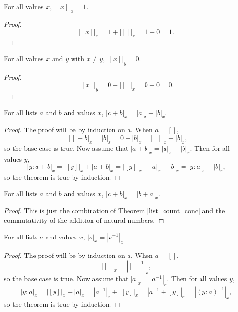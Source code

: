 \documentclass[../math.tex]{subfiles}
\begin{document}
\begin{theorem}
    For all values $x$, $|[x]|_x = 1$.
\end{theorem}
\begin{proof}
    \[
        |[x]|_x = 1 + |[]|_x = 1 + 0 = 1.
    \]
\end{proof}

\begin{theorem}
    For all values $x$ and $y$ with $x \neq y$, $|[x]|_y = 0$.
\end{theorem}
\begin{proof}
    \[
        |[x]|_y = 0 + |[]|_x = 0 + 0 = 0.
    \]
\end{proof}

\begin{theorem} \label{list_count_conc}
    For all lists $a$ and $b$ and values $x$, $|a + b|_x = |a|_x + |b|_x$.
\end{theorem}
\begin{proof}
    The proof will be by induction on $a$.  When $a = []$,
    \[
        |[] + b|_x = |b|_x = 0 + |b|_x = |[]|_x + |b|_x,
    \]
    so the base case is true.  Now assume that $|a + b|_x = |a|_x + |b|_x$.
    Then for all values $y$,
    \[
        |y : a + b|_x = |[y]|_x + |a + b|_x = |[y]|_x + |a|_x + |b|_x
        = |y : a|_x + |b|_x,
    \]
    so the theorem is true by induction.
\end{proof}

\begin{theorem} \label{list_count_comm}
    For all lists $a$ and $b$ and values $x$, $|a + b|_x = |b + a|_x$.
\end{theorem}
\begin{proof}
    This is just the combination of Theorem \ref{list_count_conc} and the
    commutativity of the addition of natural numbers.
\end{proof}

\begin{theorem} \label{list_count_reverse}
    For all lists $a$ and values $x$, $|a|_x = |a^{-1}|_x$.
\end{theorem}
\begin{proof}
    The proof will be by induction on $a$.  When $a = []$,
    \[
        |[]|_x = |[]^{-1}|_x,
    \]
    so the base case is true.  Now assume that $|a|_x = |a^{-1}|_x$.  Then for
    all values $y$,
    \[
        |y : a|_x = |[y]|_x + |a|_x = |a^{-1}|_x + |[y]|_x = |a^{-1} + [y]|_x
        = |(y : a)^{-1}|_x,
    \]
    so the theorem is true by induction.
\end{proof}
\end{document}

